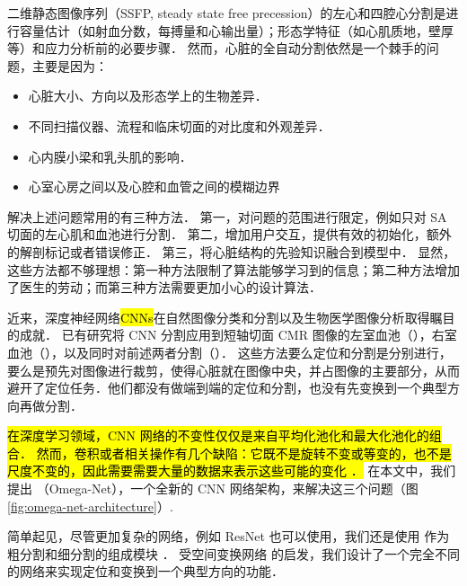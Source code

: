 

二维静态图像序列（SSFP, steady state free precession）的左心和四腔心分割是进行容量估计（如射血分数，每搏量和心输出量）；形态学特征（如心肌质地，壁厚等）和应力分析\citep{Peng2016}前的必要步骤．
然而，心脏的全自动分割依然是一个棘手的问题，主要是因为：

\begin{itemize}
\item 心脏大小、方向以及形态学上的生物差异．
\item 不同扫描仪器、流程和临床切面的对比度和外观差异．
\item 心内膜小梁和乳头肌的影响．
\item 心室心房之间以及心腔和血管之间的模糊边界
\end{itemize}

解决上述问题常用的有三种方法．
第一，对问题的范围进行限定，例如只对 SA 切面的左心肌和血池进行分割．
第二，增加用户交互，提供有效的初始化，额外的解剖标记或者错误修正．
第三，将心脏结构的先验知识融合到模型中．
显然，这些方法都不够理想：第一种方法限制了算法能够学习到的信息；第二种方法增加了医生的劳动；而第三种方法需要更加小心的设计算法． 

近来，深度神经网络\hl{CNNs}在自然图像分类\hl{\citep{Krizhevsky2012,Simonyan2015}}和分割\citep{Long2015,Noh2015,Yu2016}以及生物医学图像分析\citep{Ronneberger2015,Xie2015}取得瞩目的成就．
已有研究将 CNN 分割应用到短轴切面 CMR 图像的左室血池（\citep{Tan2016,Poudel2016a,Tan2017}），右室血池（\citep{Luo2016}），以及同时对前述两者分割（\citep{Tran2016,Lieman-Sifry2017,Vigneault2017}）．
这些方法要么定位和分割是分别进行\citep{Tan2016, Poudel2016a, Tan2017, Luo2016}，要么是预先对图像进行裁剪，使得心脏就在图像中央，并占图像的主要部分，从而避开了定位任务\hl{\citep{Tran2016, Lieman-Sifry2017, Vigneault2017}}．他们都没有做端到端的定位和分割，也没有先变换到一个典型方向再做分割．



\hl{
在深度学习领域，CNN 网络的不变性仅仅是来自平均化池化和最大化池化的组合．
然而，卷积或者相关操作有几个缺陷：它既不是旋转不变或等变的，也不是尺度不变的，因此需要需要大量的数据来表示这些可能的变化 \citep{Sifre2013, Dieleman2015}．
}
在本文中，我们提出 \omeganet{}（Omega-Net），一个全新的 CNN 网络架构，来解决这三个问题（图 \ref{fig:omega-net-architecture}）.

简单起见，尽管更加复杂的网络，例如 ResNet \citep{He2016} 也可以使用，我们还是使用 \UNet{} 作为粗分割和细分割的组成模块 \citep{Ronneberger2015}．
受空间变换网络 \citep{Jaderberg2015} 的启发，我们设计了一个完全不同的网络来实现定位和变换到一个典型方向的功能．

